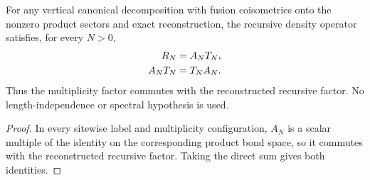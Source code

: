 \begin{lemma}%
    \label{cor:mpdo_fusion_clause_topological_density_factor_commutator}
    \leanok
    For any vertical canonical decomposition with fusion coisometries onto
    the nonzero product sectors and exact reconstruction, the recursive
    density operator satisfies, for every $N>0$,
    \begin{align}
        R_N    & =A_NT_N,
        \notag            \\
        A_NT_N & =T_NA_N.
        \notag
    \end{align}
    Thus the multiplicity factor commutes with the reconstructed
    recursive factor. No length-independence or spectral hypothesis is used.
\end{lemma}
\begin{proof}\leanok
    In every sitewise label and multiplicity configuration, $A_N$ is a scalar
    multiple of the identity on the corresponding product bond space, so it
    commutes with the reconstructed recursive factor. Taking the direct sum
    gives both identities.
\end{proof}

